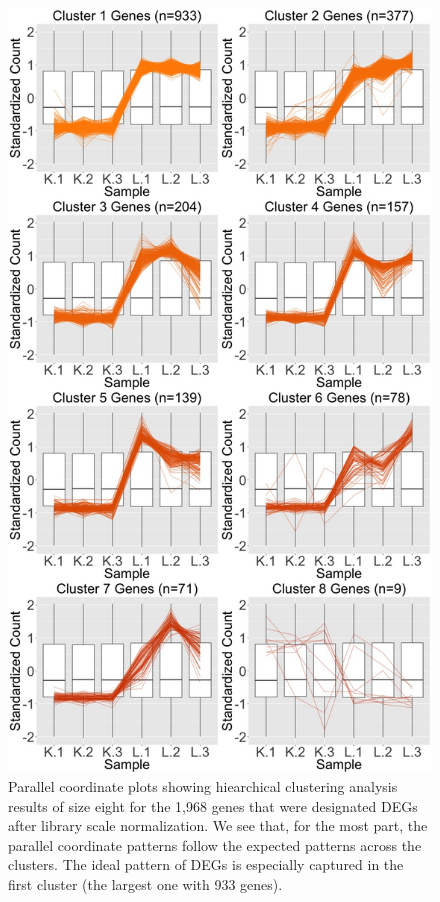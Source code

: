 \documentclass{article}
\begin{document}
\null
\begin{figure}[t!]
\centerline{\includegraphics[width=0.65\columnwidth]{../Bioinformatics/Pictures/liverKidney/Clustering_data_FDR_001_TMMvRaw_Orig/K_L_8.jpg}}
\caption{Parallel coordinate plots showing hiearchical clustering analysis results of size eight for the 1,968 genes that were designated DEGs after library scale normalization. We see that, for the most part, the parallel coordinate patterns follow the expected patterns across the clusters. The ideal pattern of DEGs is especially captured in the first cluster (the largest one with 933 genes).
\label{OrigPCP}}
\end{figure}
\end{document}
